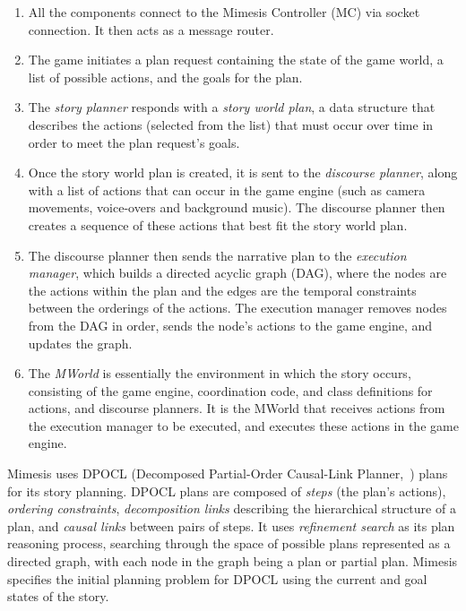 \documentclass[11pt]{report}
\begin{document}
\begin{enumerate}
  \item All the components connect to the Mimesis Controller (MC) via socket
    connection. It then acts as a message router.
  \item The game initiates a plan request containing the state of the game
    world, a list of possible actions, and the goals for the plan.
  \item The \emph{story planner} responds with a \emph{story world plan}, a data
    structure that describes the actions (selected from the list) that must occur over time in order to
    meet the plan request's goals.
  \item Once the story world plan is created, it is sent to the \emph{discourse
      planner}, along with a list of actions that can occur in the game engine
    (such as camera movements, voice-overs and background
    music). The discourse planner then creates a sequence of these actions that
    best fit the story world plan.
  \item The discourse planner then sends the narrative plan to the
    \emph{execution manager}, which builds a directed acyclic graph (DAG), where
    the nodes are the actions within the plan and the edges are the temporal
    constraints between the orderings of the actions. The execution manager
    removes nodes from the DAG in order, sends the node's actions to the
    game engine, and updates the graph.
  \item The \emph{MWorld} is essentially the environment in which the story
    occurs, consisting of the game engine, coordination code, and class
    definitions for actions, and discourse planners. It is the MWorld that
    receives actions from the execution manager to be executed, and executes
    these actions in the game engine.
\end{enumerate}

Mimesis uses DPOCL (Decomposed Partial-Order Causal-Link Planner,~\citep{young1994decomposition}) plans for
its story planning. DPOCL plans are composed of \emph{steps} (the plan's
actions), \emph{ordering constraints}, \emph{decomposition links} describing the
hierarchical structure of a plan, and \emph{causal links} between pairs of
steps. It uses \emph{refinement search} \citep{kambhampati1995planning} as its
plan reasoning process, searching through the space of possible plans represented as a directed
graph, with each node in the graph being a plan or partial plan. Mimesis
specifies the initial planning problem for DPOCL using the current and goal
states of the story.
\end{document}
